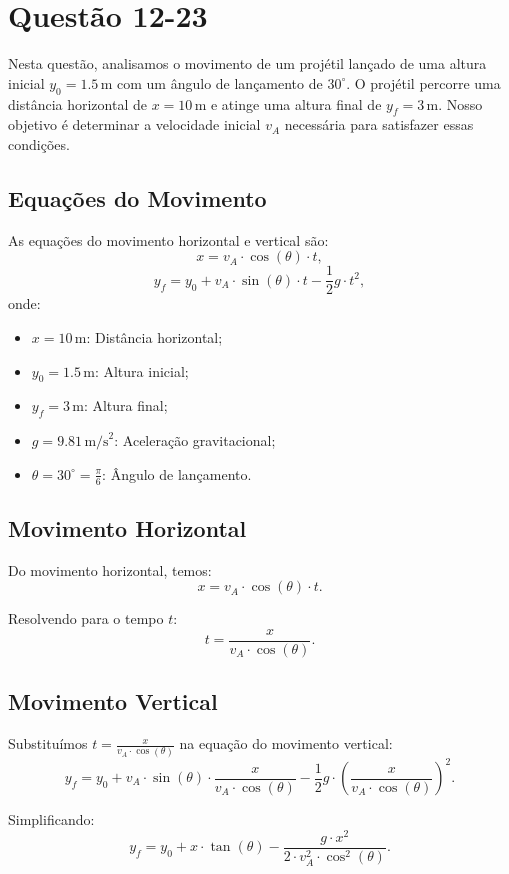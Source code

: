 \section{Questão 12-23}

Nesta questão, analisamos o movimento de um projétil lançado de uma altura inicial \(y_0 = 1.5 \, \text{m}\) com um ângulo de lançamento de \(30^\circ\). O projétil percorre uma distância horizontal de \(x = 10 \, \text{m}\) e atinge uma altura final de \(y_f = 3 \, \text{m}\). Nosso objetivo é determinar a velocidade inicial \(v_A\) necessária para satisfazer essas condições.

\subsection*{Equações do Movimento}
As equações do movimento horizontal e vertical são:
\[
x = v_A \cdot \cos(\theta) \cdot t,
\]
\[
y_f = y_0 + v_A \cdot \sin(\theta) \cdot t - \frac{1}{2} g \cdot t^2,
\]
onde:
\begin{itemize}
    \item \(x = 10 \, \text{m}\): Distância horizontal;
    \item \(y_0 = 1.5 \, \text{m}\): Altura inicial;
    \item \(y_f = 3 \, \text{m}\): Altura final;
    \item \(g = 9.81 \, \text{m/s}^2\): Aceleração gravitacional;
    \item \(\theta = 30^\circ = \frac{\pi}{6}\): Ângulo de lançamento.
\end{itemize}

\subsection*{Movimento Horizontal}
Do movimento horizontal, temos:
\[
x = v_A \cdot \cos(\theta) \cdot t.
\]

Resolvendo para o tempo \(t\):
\[
t = \frac{x}{v_A \cdot \cos(\theta)}.
\]

\subsection*{Movimento Vertical}
Substituímos \(t = \frac{x}{v_A \cdot \cos(\theta)}\) na equação do movimento vertical:
\[
y_f = y_0 + v_A \cdot \sin(\theta) \cdot \frac{x}{v_A \cdot \cos(\theta)} - \frac{1}{2} g \cdot \left(\frac{x}{v_A \cdot \cos(\theta)}\right)^2.
\]

Simplificando:
\[
y_f = y_0 + x \cdot \tan(\theta) - \frac{g \cdot x^2}{2 \cdot v_A^2 \cdot \cos^2(\theta)}.
\]

